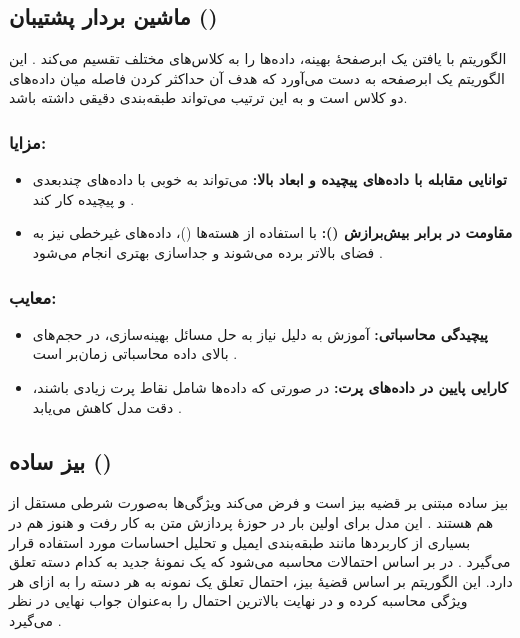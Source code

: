 \subsection{ماشین بردار پشتیبان ()}
الگوریتم  با یافتن یک ابرصفحهٔ بهینه، داده‌ها را به کلاس‌های مختلف تقسیم می‌کند
\cite{cortes1995support,vapnik1998statistical}.
این الگوریتم یک ابرصفحه به دست می‌آورد که هدف آن حداکثر کردن فاصله میان داده‌های دو کلاس است و به این ترتیب می‌تواند طبقه‌بندی دقیقی داشته باشد.

\subsubsection{مزایا:}
\begin{itemize}
	\item \textbf{توانایی مقابله با داده‌های پیچیده و ابعاد بالا:}
	 می‌تواند به خوبی با داده‌های چندبعدی و پیچیده کار کند
	\cite{vapnik1998statistical}.
	\item \textbf{مقاومت در برابر بیش‌برازش ():}
	با استفاده از هسته‌ها ()، داده‌های غیرخطی نیز به فضای بالاتر برده می‌شوند و جداسازی بهتری انجام می‌شود
	\cite{cortes1995support}.
\end{itemize}

\subsubsection{معایب:}
\begin{itemize}
	\item \textbf{پیچیدگی محاسباتی:}
	آموزش  به دلیل نیاز به حل مسائل بهینه‌سازی، در حجم‌های بالای داده محاسباتی زمان‌بر است
	\cite{murphy2012machine}.
	\item \textbf{کارایی پایین در داده‌های پرت:}
	در صورتی که داده‌ها شامل نقاط پرت زیادی باشند، دقت مدل کاهش می‌یابد
	\cite{bishop2006pattern}.
\end{itemize}


\subsection{بیز ساده ()}
بیز ساده مبتنی بر قضیه بیز است و فرض می‌کند ویژگی‌ها به‌صورت شرطی مستقل از هم هستند
\cite{domingos1997optimal,mitchell1997machine}.
این مدل برای اولین بار در حوزهٔ پردازش متن به کار رفت و هنوز هم در بسیاری از کاربردها مانند طبقه‌بندی ایمیل و تحلیل احساسات مورد استفاده قرار می‌گیرد
\cite{mccallum1998comparison}. 
در  بر اساس احتمالات محاسبه می‌شود که یک نمونهٔ جدید به کدام دسته تعلق دارد. این الگوریتم بر اساس قضیهٔ بیز، احتمال تعلق یک نمونه به هر دسته را به ازای هر ویژگی محاسبه کرده و در نهایت بالاترین احتمال را به‌عنوان جواب نهایی در نظر می‌گیرد
\cite{bishop2006pattern}.

